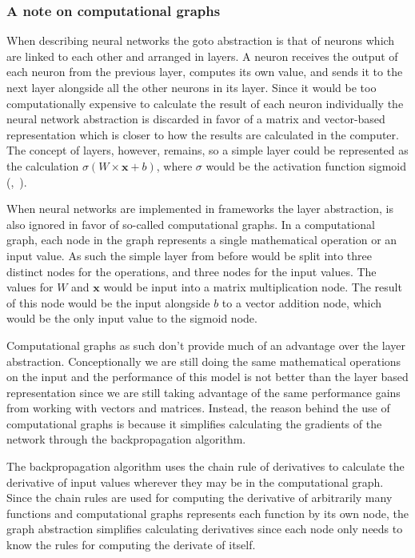 \subsubsection*{A note on computational graphs}

When describing neural networks the goto abstraction is that of neurons which
are linked to each other and arranged in layers. A neuron receives the output of
each neuron from the previous layer, computes its own value, and sends it to the
next layer alongside all the other neurons in its layer. Since it would be too
computationally expensive to calculate the result of each neuron individually
the neural network abstraction is discarded in favor of a matrix and
vector-based representation which is closer to how the results are calculated in
the computer. The concept of layers, however, remains, so a simple layer could be
represented as the calculation $\sigma(W \times \bm{x} + b)$, where $\sigma$
would be the activation function sigmoid
(\cite[Chapter~6.5.1]{goodfellow2016deep},~\cite[Chapter~5.1]{goldberg2017neural}).

When neural networks are implemented in frameworks the layer abstraction, is also
ignored in favor of so-called computational graphs. In a computational graph,
each node in the graph represents a single mathematical operation or an input
value. As such the simple layer from before would be split into three distinct
nodes for the operations, and three nodes for the input values. The values for
$W$ and $\bm{x}$ would be input into a matrix multiplication node. The result of
this node would be the input alongside $b$ to a vector addition node, which
would be the only input value to the sigmoid node.


Computational graphs as such don't provide much of an advantage over the layer
abstraction. Conceptionally we are still doing the same mathematical operations
on the input and the performance of this model is not better than the layer based
representation since we are still taking advantage of the same performance
gains from working with vectors and matrices. Instead, the reason behind the use
of computational graphs is because it simplifies calculating the gradients of
the network through the backpropagation algorithm. 

The backpropagation algorithm uses the chain rule of derivatives to calculate
the derivative of input values wherever they may be in the computational graph.
Since the chain rules are used for computing the derivative of arbitrarily many
functions and computational graphs represents each function by its own node,
the graph abstraction simplifies calculating derivatives since each node only
needs to know the rules for computing the derivate of itself.
 

